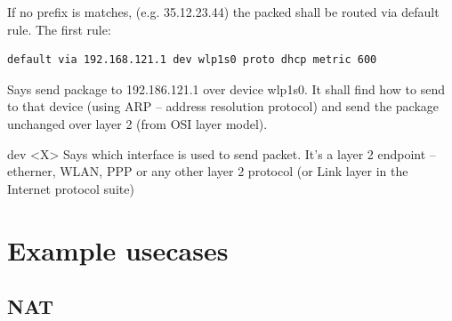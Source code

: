 \documentclass[times, utf8, seminar, english]{fer}
\begin{document}
If no prefix is matches, (e.g. 35.12.23.44) the packed shall be routed via default rule. The first rule:

\begin{verbatim}
default via 192.168.121.1 dev wlp1s0 proto dhcp metric 600
\end{verbatim}

Says send package to 192.186.121.1 over device wlp1s0. It shall find how to send to that device (using ARP -- address resolution protocol) and send the package unchanged over layer 2 (from OSI layer model).

dev <X> Says which interface is used to send packet. It's a layer 2 endpoint -- etherner, WLAN, PPP or any other layer 2 protocol (or Link layer in the Internet protocol suite)
\chapter{Example usecases}

\section{NAT}
\label{sec:NAT}
\end{document}
